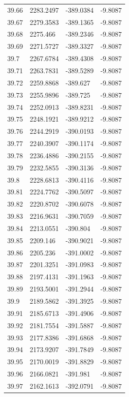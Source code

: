 \begin{table}[H]
\begin{tabular}{llll}
39.66 & 2283.2497 & -389.0384 & -9.8087 \\
39.67 & 2279.3583 & -389.1365 & -9.8087 \\
39.68 & 2275.466 & -389.2346 & -9.8087 \\
39.69 & 2271.5727 & -389.3327 & -9.8087 \\
39.7 & 2267.6784 & -389.4308 & -9.8087 \\
39.71 & 2263.7831 & -389.5289 & -9.8087 \\
39.72 & 2259.8868 & -389.627 & -9.8087 \\
39.73 & 2255.9896 & -389.725 & -9.8087 \\
39.74 & 2252.0913 & -389.8231 & -9.8087 \\
39.75 & 2248.1921 & -389.9212 & -9.8087 \\
39.76 & 2244.2919 & -390.0193 & -9.8087 \\
39.77 & 2240.3907 & -390.1174 & -9.8087 \\
39.78 & 2236.4886 & -390.2155 & -9.8087 \\
39.79 & 2232.5855 & -390.3136 & -9.8087 \\
39.8 & 2228.6813 & -390.4116 & -9.8087 \\
39.81 & 2224.7762 & -390.5097 & -9.8087 \\
39.82 & 2220.8702 & -390.6078 & -9.8087 \\
39.83 & 2216.9631 & -390.7059 & -9.8087 \\
39.84 & 2213.0551 & -390.804 & -9.8087 \\
39.85 & 2209.146 & -390.9021 & -9.8087 \\
39.86 & 2205.236 & -391.0002 & -9.8087 \\
39.87 & 2201.3251 & -391.0983 & -9.8087 \\
39.88 & 2197.4131 & -391.1963 & -9.8087 \\
39.89 & 2193.5001 & -391.2944 & -9.8087 \\
39.9 & 2189.5862 & -391.3925 & -9.8087 \\
39.91 & 2185.6713 & -391.4906 & -9.8087 \\
39.92 & 2181.7554 & -391.5887 & -9.8087 \\
39.93 & 2177.8386 & -391.6868 & -9.8087 \\
39.94 & 2173.9207 & -391.7849 & -9.8087 \\
39.95 & 2170.0019 & -391.8829 & -9.8087 \\
39.96 & 2166.0821 & -391.981 & -9.8087 \\
39.97 & 2162.1613 & -392.0791 & -9.8087 \\

\end{tabular}
\end{table}
